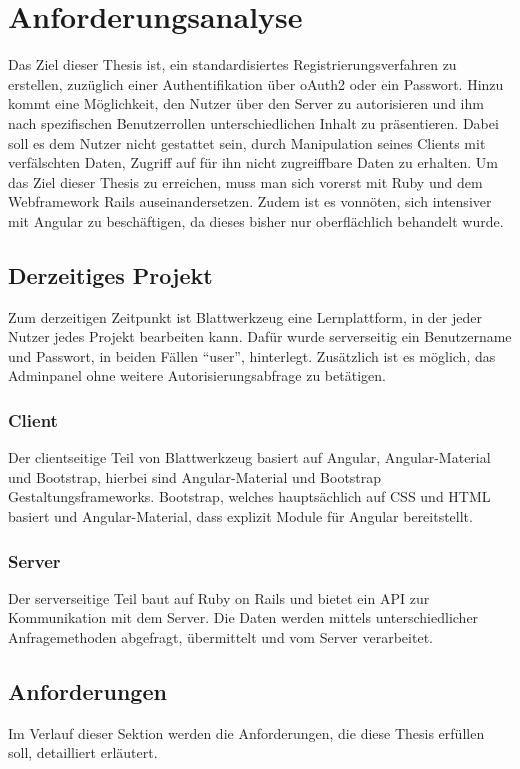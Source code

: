 \section{Anforderungsanalyse}
\label{sec:analyze}
Das Ziel dieser Thesis ist, ein standardisiertes Registrierungsverfahren zu erstellen, zuzüglich einer Authentifikation über \gls{oAuth2} oder ein Passwort. Hinzu kommt eine Möglichkeit, den Nutzer über den Server zu autorisieren und ihm nach spezifischen Benutzerrollen unterschiedlichen Inhalt zu präsentieren. Dabei soll es dem Nutzer nicht gestattet sein, durch Manipulation seines Clients mit verfälschten Daten, Zugriff auf für ihn nicht zugreiffbare Daten zu erhalten. Um das Ziel dieser Thesis zu erreichen, muss man sich vorerst mit Ruby und dem Webframework Rails auseinandersetzen. Zudem ist es vonnöten, sich intensiver mit Angular zu beschäftigen, da dieses bisher nur oberflächlich behandelt wurde.

\subsection{Derzeitiges Projekt}
\label{sec: current_project}
Zum derzeitigen Zeitpunkt ist Blattwerkzeug eine Lernplattform, in der jeder Nutzer jedes Projekt bearbeiten kann. Dafür wurde serverseitig ein Benutzername und Passwort, in beiden Fällen \enquote{user}, hinterlegt. Zusätzlich ist es möglich, das Adminpanel ohne weitere Autorisierungsabfrage zu betätigen.

\subsubsection{Client}
Der clientseitige Teil von Blattwerkzeug basiert auf Angular, Angular-Material und Bootstrap, hierbei sind Angular-Material und Bootstrap Gestaltungsframeworks. Bootstrap, welches hauptsächlich auf \gls{CSS} und \gls{HTML} basiert und Angular-Material, dass explizit Module für Angular bereitstellt.

\subsubsection{Server}
Der serverseitige Teil baut auf Ruby on Rails und bietet ein \gls{API} zur Kommunikation mit dem Server. Die Daten werden mittels unterschiedlicher Anfragemethoden abgefragt, übermittelt und vom Server verarbeitet.

\subsection{Anforderungen}
\label{sec: requirement}
Im Verlauf dieser Sektion werden die Anforderungen, die diese Thesis erfüllen soll, detailliert erläutert.

